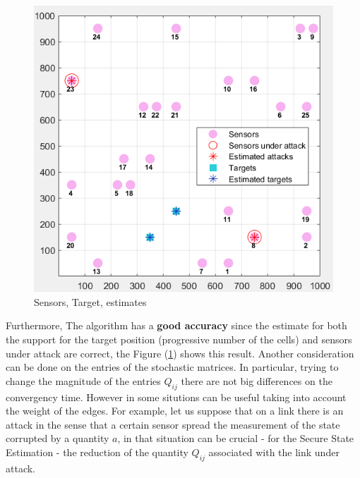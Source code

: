 \begin{figure}
    \vspace{-0.3cm}
    \includegraphics[width=0.9\linewidth]{img/Room.png} 
    \caption{Sensors, Target, estimates}
    \label{fig:Room}
\end{figure}
Furthermore, The algorithm has a \textbf{good accuracy} since the estimate for both the support for the target position (progressive number of the cells) and sensors under attack are correct, the Figure (\ref{fig:Room}) shows this result.
Another consideration can be done on the entries of the stochastic matrices. In particular, trying to change the magnitude of the entries $Q_{ij}$ there are not big differences on the convergency time. However in some situtions can be useful taking into account the weight of the edges. For example, let us suppose that on a link there is an attack in the sense that a certain sensor spread the measurement of the state corrupted by a quantity $a$, in that situation can be crucial - for the Secure State Estimation - the reduction of the quantity $Q_{ij}$ associated with the link under attack.

